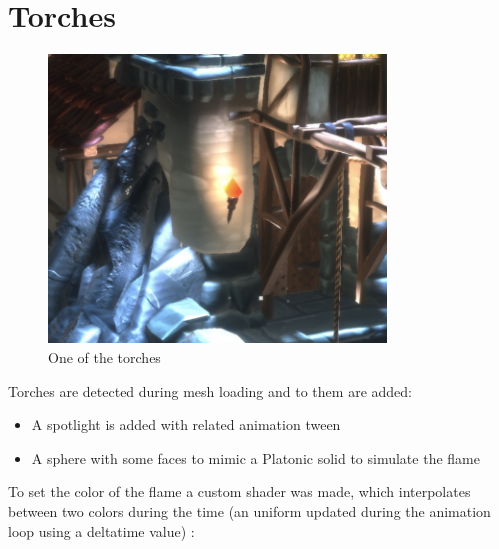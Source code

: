 \documentclass[10pt,a4paper]{article}
\begin{document}
\section{Torches}

\begin{figure}[H]
\caption{One of the torches}
\includegraphics[width=0.8\textwidth]{torch}
\end{figure}


Torches are detected during mesh loading and to them are added:

\begin{itemize}
 \item A spotlight is added with related animation tween
 \item A sphere with some faces to mimic a Platonic solid to simulate the flame
\end{itemize}

To set the color of the flame a custom shader was made, which interpolates between two colors during the time (an uniform updated during the animation loop using a deltatime value) :
\end{document}
